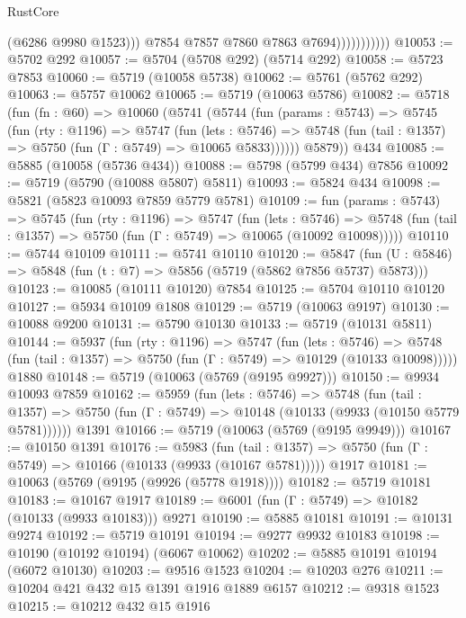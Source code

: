 \begin{lexlean}{RustCore}
\begin{coremodule}
{\begin{coremodule}
{{{{{{{{{{{{{{{{{{{{{{{{{{{{{{{{{{{{{{{{{{{{                              (@6286 @9980 @1523)))
                          @7854
                          @7857
                          @7860
                          @7863
                          @7694)))))))))))
@10053 := @5702 @292
@10057 := @5704 (@5708 @292) (@5714 @292)
@10058 := @5723 @7853
@10060 := @5719 (@10058 @5738)
@10062 := @5761 (@5762 @292)
@10063 := @5757 @10062
@10065 := @5719 (@10063 @5786)
@10082 := @5718
    (fun (fn : @60) =>
    @10060
      (@5741
        (@5744
          (fun (params : @5743) =>
          @5745
            (fun (rty : @1196) =>
            @5747
              (fun (lets : @5746) =>
              @5748 (fun (tail : @1357) => @5750 (fun (Γ : @5749) => @10065 @5833))))))
        @5879))
    @434
@10085 := @5885 (@10058 (@5736 @434))
@10088 := @5798 (@5799 @434) @7856
@10092 := @5719 (@5790 (@10088 @5807) @5811)
@10093 := @5824 @434
@10098 := @5821 (@5823 @10093 @7859 @5779 @5781)
@10109 := fun (params : @5743) =>
  @5745
    (fun (rty : @1196) =>
    @5747
      (fun (lets : @5746) =>
      @5748 (fun (tail : @1357) => @5750 (fun (Γ : @5749) => @10065 (@10092 @10098)))))
@10110 := @5744 @10109
@10111 := @5741 @10110
@10120 := @5847 (fun (U : @5846) => @5848 (fun (t : @7) => @5856 (@5719 (@5862 @7856 @5737) @5873)))
@10123 := @10085 (@10111 @10120) @7854
@10125 := @5704 @10110 @10120
@10127 := @5934 @10109 @1808
@10129 := @5719 (@10063 @9197)
@10130 := @10088 @9200
@10131 := @5790 @10130
@10133 := @5719 (@10131 @5811)
@10144 := @5937
    (fun (rty : @1196) =>
    @5747
      (fun (lets : @5746) =>
      @5748 (fun (tail : @1357) => @5750 (fun (Γ : @5749) => @10129 (@10133 @10098)))))
    @1880
@10148 := @5719 (@10063 (@5769 (@9195 @9927)))
@10150 := @9934 @10093 @7859
@10162 := @5959
    (fun (lets : @5746) =>
    @5748
      (fun (tail : @1357) =>
      @5750 (fun (Γ : @5749) => @10148 (@10133 (@9933 (@10150 @5779 @5781))))))
    @1391
@10166 := @5719 (@10063 (@5769 (@9195 @9949)))
@10167 := @10150 @1391
@10176 := @5983
    (fun (tail : @1357) => @5750 (fun (Γ : @5749) => @10166 (@10133 (@9933 (@10167 @5781)))))
    @1917
@10181 := @10063 (@5769 (@9195 (@9926 (@5778 @1918))))
@10182 := @5719 @10181
@10183 := @10167 @1917
@10189 := @6001 (fun (Γ : @5749) => @10182 (@10133 (@9933 @10183))) @9271
@10190 := @5885 @10181
@10191 := @10131 @9274
@10192 := @5719 @10191
@10194 := @9277 @9932 @10183
@10198 := @10190 (@10192 @10194) (@6067 @10062)
@10202 := @5885 @10191 @10194 (@6072 @10130)
@10203 := @9516 @1523
@10204 := @10203 @276
@10211 := @10204 @421 @432 @15 @1391 @1916 @1889 @6157
@10212 := @9318 @1523
@10215 := @10212 @432 @15 @1916
}}}}}}}}}}}}}}}}}}}}}}}}}}}}}}}}}}}}}}}}}}}}
\end{coremodule}}
\end{coremodule}
\end{lexlean}
